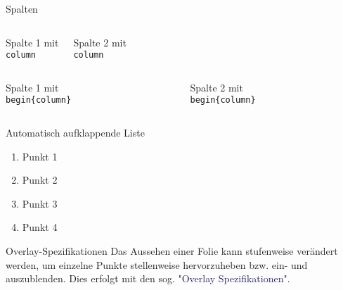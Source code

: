 \begin{frame}{Spalten}
    \begin{columns}
        \begin{center}
            Spalte 1 mit \texttt{\\column}
        \end{center}

        \begin{center}
            Spalte 2 mit \texttt{\\column}
        \end{center}
    \end{columns}

    \bigskip

    \begin{columns}
        \begin{column}{.5\textwidth}
            \begin{center}
                Spalte 1 mit \texttt{\\begin\{column\}}
            \end{center}
        \end{column}
        \begin{column}{.5\textwidth}
            \begin{center}
                Spalte 2 mit \texttt{\\begin\{column\}}
            \end{center}
        \end{column}

    \end{columns}
\end{frame}

\begin{frame}{Automatisch aufklappende Liste}
    \begin{enumerate}[<+->]
        \item Punkt 1
        \item Punkt 2
        \item Punkt 3
        \item Punkt 4
    \end{enumerate}
\end{frame}

\begin{frame}{Overlay-Spezifikationen}
    Das Aussehen einer Folie kann stufenweise verändert werden, um einzelne
    Punkte stellenweise hervorzuheben bzw. ein- und auszublenden. Dies erfolgt
    mit den sog. \textcolor<2->{MidnightBlue}{"Overlay Spezifikationen"}.

    \bigskip


    \bigskip

\end{frame}


